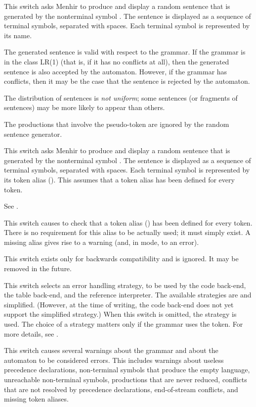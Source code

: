 \documentclass[onecolumn,11pt,nocopyrightspace,preprint]{sigplanconf}
\begin{document}
 This switch asks Menhir to produce
and display a random sentence that is generated by the nonterminal symbol
. The sentence is displayed as a sequence of terminal symbols,
separated with spaces. Each terminal symbol is represented by its name.

The generated sentence is valid with respect to the grammar. If the grammar is
in the class LR(1) (that is, if it has no conflicts at all), then the
generated sentence is also accepted by the automaton. However, if the grammar
has conflicts, then it may be the case that the sentence is rejected by the
automaton.

The distribution of sentences is \emph{not uniform}; some sentences (or
fragments of sentences) may be more likely to appear than others.

The productions that involve the \error pseudo-token are ignored by the
random sentence generator.

 This switch asks Menhir to
produce and display a random sentence that is generated by the nonterminal
symbol . The sentence is displayed as a sequence of terminal
symbols, separated with spaces. Each terminal symbol is represented by its
token alias (). This assumes that a token alias has been
defined for every token.

\docswitch{\orawdepend} See .

\docswitch{\orequirealiases} This switch causes \menhir to check that a token
alias () has been defined for every token. There is no
requirement for this alias to be actually used; it must simply exist. A
missing alias gives rise to a warning (and, in \ostrict mode, to an error).

 This switch exists only for
backwards compatibility and is ignored. It may be removed in the future.

 This switch selects an error handling
strategy, to be used by the code back-end, the table back-end, and the
reference interpreter. The available strategies are \legacy and
simplified. (However, at the time of writing, the code back-end does
not yet support the simplified strategy.) When this switch is
omitted, the \legacy strategy is used. The choice of a strategy
matters only if the grammar uses the \error token. For more details, see
.

\docswitch{\ostrict} This switch causes several warnings about the grammar
and about the automaton to be considered errors. This includes warnings about
useless precedence declarations, non-terminal symbols that produce the empty
language, unreachable non-terminal symbols, productions that are never
reduced, conflicts that are not resolved by precedence declarations,
end-of-stream conflicts, and missing token aliases.
\end{document}
